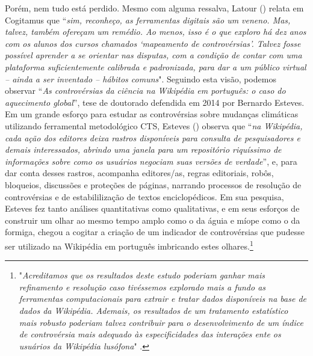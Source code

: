 Porém, nem tudo está perdido. Mesmo com alguma ressalva, Latour (\citeyear[p.167]{latour_cogitamus_2010}) relata em Cogitamus que “\textit{sim, reconheço, as ferramentas digitais são um veneno. Mas, talvez, também ofereçam um remédio. Ao menos, isso é o que exploro há dez anos com os alunos dos cursos chamados ‘mapeamento de controvérsias’. Talvez fosse possível aprender a se orientar nas disputas, com a condição de contar com uma plataforma suficientemente calibrada e padronizada, para dar a um público virtual – ainda a ser inventado – hábitos comuns}". Seguindo esta visão, podemos observar “\textit{As controvérsias da ciência na Wikipédia em português: o caso do aquecimento global}”, tese de doutorado defendida em 2014 por Bernardo Esteves. Em um grande esforço para estudar as controvérsias sobre mudanças climáticas utilizando ferramental metodológico CTS, Esteves (\citeyear[p.295]{esteves_as_2014}) observa que “\textit{na Wikipédia, cada ação dos editores deixa rastros disponíveis para consulta de pesquisadores e demais interessados, abrindo uma janela para um repositório riquíssimo de informações sobre como os usuários negociam suas versões de verdade}”, e, para dar conta desses rastros, acompanha editores/as, regras editoriais, robôs, bloqueios, discussões e proteções de páginas, narrando processos de resolução de controvérsias e de estabililização de textos enciclopédicos. Em sua pesquisa, Esteves fez tanto análises quantitativas como qualitativas, e em seus esforços de construir um olhar ao mesmo tempo amplo como o da águia e míope como o da formiga, chegou a cogitar a criação de um indicador de controvérsias que pudesse ser utilizado na Wikipédia em português imbricando estes olhares.\footnote{"\textit{Acreditamos que os resultados deste estudo poderiam ganhar mais refinamento e resolução caso tivéssemos explorado mais a fundo as ferramentas computacionais para extrair e tratar dados disponíveis na base de dados da Wikipédia. Ademais, os resultados de um tratamento estatístico mais robusto poderiam talvez contribuir para o desenvolvimento de um índice de controvérsia mais adequado às especificidades das interações ente os usuários da Wikipédia lusófona}" \cite[p.296]{esteves_as_2014}.}

